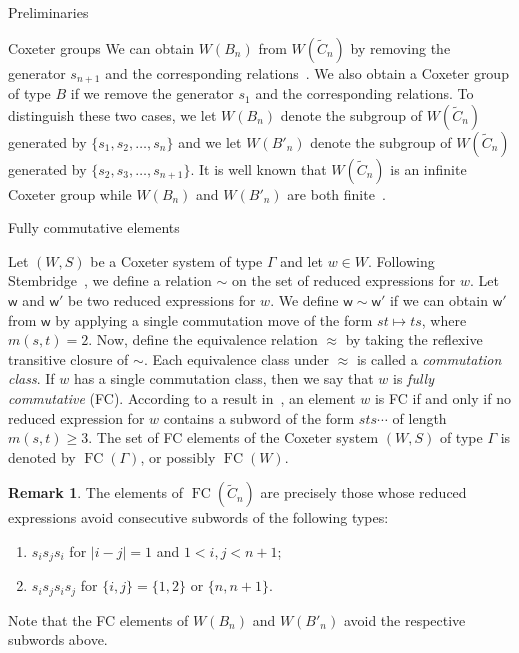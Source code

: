 \documentclass[11pt]{amsart}
\theoremstyle{definition}
\newtheorem{remark}[theorem]{Remark}
\numberwithin{equation}{section}
\newcommand{\C}{\widetilde{C}}
\renewcommand{\(}{\left(}
\renewcommand{\)}{\right)}
\newcommand{\w}{\mathsf{w}}
\DeclareMathOperator{\FC}{FC}
\begin{document}
\begin{section}{Preliminaries}
\begin{subsection}{Coxeter groups}
We can obtain $W(B_{n})$ from $W(\C_{n})$ by removing the generator $s_{n+1}$ and the corresponding relations~\cite[Chapter 5]{Humphreys1990}.  We also obtain a Coxeter group of type $B$ if we remove the generator $s_{1}$ and the corresponding relations.  To distinguish these two cases, we let $W(B_{n})$ denote the subgroup of $W(\C_{n})$ generated by $\{s_{1}, s_{2}, \dots, s_{n}\}$ and we let $W(B'_{n})$ denote the subgroup of $W(\C_{n})$ generated by $\{s_{2}, s_{3}, \dots, s_{n+1}\}$.  It is well known that $W(\C_{n})$ is an infinite Coxeter group while $W(B_{n})$ and $W(B'_{n})$ are both finite~\cite[Chapters 2 and 6]{Humphreys1990}.

\end{subsection}


\begin{subsection}{Fully commutative elements}\label{subsec:FC}

Let $(W,S)$ be a Coxeter system of type $\Gamma$ and let $w \in W$. Following Stembridge~\cite{Stembridge1996}, we define a relation $\sim$ on the set of reduced expressions for $w$.  Let $\w$ and $\w'$ be two reduced expressions for $w$.  We define $\w \sim \w'$ if we can obtain $\w'$ from $\w$ by applying a single commutation move of the form $st \mapsto ts$, where $m(s,t)=2$.  Now, define the equivalence relation $\approx$ by taking the reflexive transitive closure of $\sim$.  Each equivalence class under $\approx$ is called a \emph{commutation class}. If $w$ has a single commutation class, then we say that $w$ is \emph{fully commutative} (FC).  According to a result in~\cite{Stembridge1996}, an element $w$ is FC if and only if no reduced expression for $w$ contains a subword of the form $sts \cdots$ of length $m(s,t) \geq 3$.  The set of FC elements of the Coxeter system $(W,S)$ of type $\Gamma$ is denoted by $\FC(\Gamma)$, or possibly $\FC(W)$.

\begin{remark}\label{rem:illegal convex chains}
The elements of $\FC(\C_{n})$ are precisely those whose reduced expressions avoid consecutive subwords of the following types:
\begin{enumerate}
\item $s_{i}s_{j}s_{i}$ for $|i-j|=1$ and $1< i,j < n+1$;
\item $s_{i}s_{j}s_{i}s_{j}$ for $\{i,j\}=\{1,2\}$ or $\{n,n+1\}$.
\end{enumerate}
Note that the FC elements of $W(B_{n})$ and $W(B'_{n})$ avoid the respective subwords above.
\end{remark}


\end{subsection}
\end{section}
\end{document}
